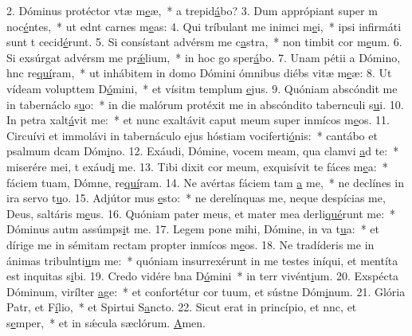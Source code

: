 2. Dóminus protéctor vtæ m\uline{e}æ,~* a  trepid\uline{á}bo?
3. Dum apprópiant super m noc\uline{é}ntes,~* ut ednt carnes m\uline{e}as:
4. Qui tríbulant me inimci m\uline{e}i,~* ipsi infirmáti sunt t cecid\uline{é}runt.
5. Si consístant advérsm me c\uline{a}stra,~* non timbit cor m\uline{e}um.
6. Si exsúrgat advérsm me pr\uline{ǽ}lium,~* in hoc go sper\uline{á}bo.
7. Unam pétii a Dómino, hnc re\uline{quí}ram,~* ut inhábitem in domo Dómini ómnibus diébs vitæ m\uline{e}æ:
8. Ut vídeam volupttem D\uline{ó}mini,~* et vísitm templum \uline{e}jus.
9. Quóniam abscóndit me in tabernáclo s\uline{u}o:~* in die malórum protéxit me in abscóndito tabernculi s\uline{u}i.
10. In petra xalt\uline{á}vit me:~* et nunc exaltávit caput meum super inmícos m\uline{e}os.
11. Circuívi et immolávi in tabernáculo ejus hóstiam vociferti\uline{ó}nis:~* cantábo et psalmum dcam Dóm\uline{i}no.
12. Exáudi, Dómine, vocem meam, qua clamvi \uline{a}d te:~* miserére mei, t exáud\uline{i} me.
13. Tibi dixit cor meum, exquisívit te fáces m\uline{e}a:~* fáciem tuam, Dómne, re\uline{quí}ram.
14. Ne avértas fáciem tam \uline{a} me,~* ne declínes in ira  servo t\uline{u}o.
15. Adjútor mus \uline{e}sto:~* ne derelínquas me, neque despícias me, Deus, saltáris m\uline{e}us.
16. Quóniam pater meus, et mater mea derli\uline{qué}runt me:~* Dóminus autm assúmps\uline{i}t me.
17. Legem pone mihi, Dómine, in va t\uline{u}a:~* et dírige me in sémitam rectam propter inmícos m\uline{e}os.
18. Ne tradíderis me in ánimas tribulnti\uline{u}m me:~* quóniam insurrexérunt in me testes iníqui, et mentíta est inquitas s\uline{i}bi.
19. Credo vidére bna D\uline{ó}mini~* in terr vivént\uline{i}um.
20. Exspécta Dóminum, virílter \uline{a}ge:~* et confortétur cor tuum, et sústne Dóm\uline{i}num.
21. Glória Patr, et F\uline{í}lio,~* et Spirtui S\uline{a}ncto.
22. Sicut erat in princípio, et nnc, et s\uline{e}mper,~* et in sǽcula sæclórum. \uline{A}men.

